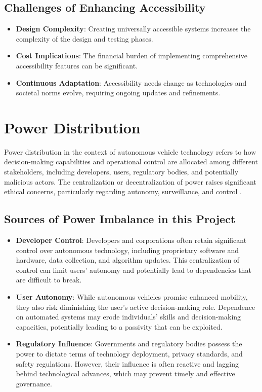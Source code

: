 \documentclass[10pt,twocolumn]{article}
\begin{document}
\subsection{Challenges of Enhancing Accessibility}
    \begin{itemize}
        \item \textbf{Design Complexity}: Creating universally accessible systems increases the complexity of the design and testing phases.
        \item \textbf{Cost Implications}: The financial burden of implementing comprehensive accessibility features can be significant.
        \item \textbf{Continuous Adaptation}: Accessibility needs change as technologies and societal norms evolve, requiring ongoing updates and refinements.
    \end{itemize}


\section{Power Distribution}
    Power distribution in the context of autonomous vehicle technology refers to how decision-making capabilities and operational control are allocated among different stakeholders, including developers, users, regulatory bodies, and potentially malicious actors. The centralization or decentralization of power raises significant ethical concerns, particularly regarding autonomy, surveillance, and control \cite{AVPowerInequity}.

\subsection{Sources of Power Imbalance in this Project}
    \begin{itemize}
        \item \textbf{Developer Control}: Developers and corporations often retain significant control over autonomous technology, including proprietary software and hardware, data collection, and algorithm updates. This centralization of control can limit users' autonomy and potentially lead to dependencies that are difficult to break.
        \item \textbf{User Autonomy}: While autonomous vehicles promise enhanced mobility, they also risk diminishing the user's active decision-making role. Dependence on automated systems may erode individuals' skills and decision-making capacities, potentially leading to a passivity that can be exploited.
        \item \textbf{Regulatory Influence}: Governments and regulatory bodies possess the power to dictate terms of technology deployment, privacy standards, and safety regulations. However, their influence is often reactive and lagging behind technological advances, which may prevent timely and effective governance.
    \end{itemize}
\end{document}
